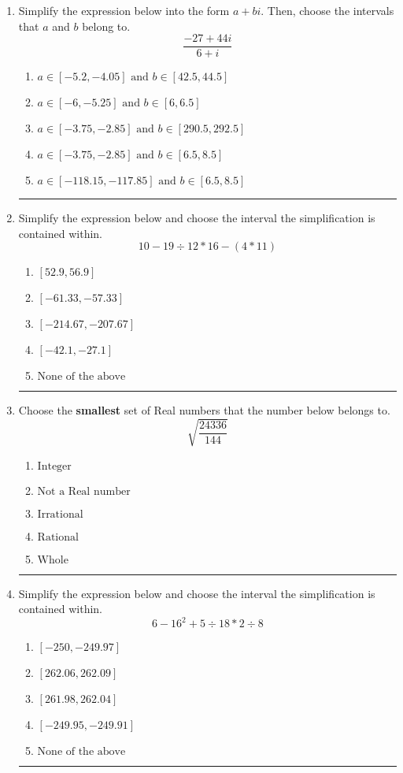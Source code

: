 \documentclass[14pt]{extbook}
\newcommand{\litem}[1]{\item#1\hspace*{-1cm}\rule{\textwidth}{0.4pt}}
\begin{document}
\begin{enumerate}
{\begin{enumerate}[label=\Alph*.]
\end{enumerate} }
\litem{
Simplify the expression below into the form $a+bi$. Then, choose the intervals that $a$ and $b$ belong to.\[ \frac{-27 + 44 i}{6 + i} \]\begin{enumerate}[label=\Alph*.]
\item \( a \in [-5.2, -4.05] \text{ and } b \in [42.5, 44.5] \)
\item \( a \in [-6, -5.25] \text{ and } b \in [6, 6.5] \)
\item \( a \in [-3.75, -2.85] \text{ and } b \in [290.5, 292.5] \)
\item \( a \in [-3.75, -2.85] \text{ and } b \in [6.5, 8.5] \)
\item \( a \in [-118.15, -117.85] \text{ and } b \in [6.5, 8.5] \)

\end{enumerate} }
\litem{
Simplify the expression below and choose the interval the simplification is contained within.\[ 10 - 19 \div 12 * 16 - (4 * 11) \]\begin{enumerate}[label=\Alph*.]
\item \( [52.9, 56.9] \)
\item \( [-61.33, -57.33] \)
\item \( [-214.67, -207.67] \)
\item \( [-42.1, -27.1] \)
\item \( \text{None of the above} \)

\end{enumerate} }
\litem{
Choose the \textbf{smallest} set of Real numbers that the number below belongs to.\[ \sqrt{\frac{24336}{144}} \]\begin{enumerate}[label=\Alph*.]
\item \( \text{Integer} \)
\item \( \text{Not a Real number} \)
\item \( \text{Irrational} \)
\item \( \text{Rational} \)
\item \( \text{Whole} \)

\end{enumerate} }
\litem{
Simplify the expression below and choose the interval the simplification is contained within.\[ 6 - 16^2 + 5 \div 18 * 2 \div 8 \]\begin{enumerate}[label=\Alph*.]
\item \( [-250, -249.97] \)
\item \( [262.06, 262.09] \)
\item \( [261.98, 262.04] \)
\item \( [-249.95, -249.91] \)
\item \( \text{None of the above} \)


\end{enumerate}}
\end{enumerate}
\end{document}
